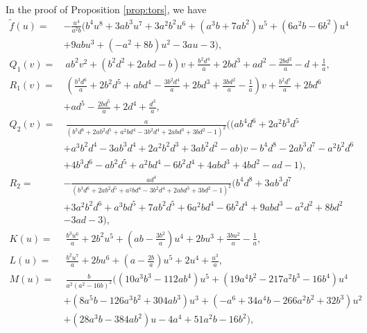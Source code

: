 \documentclass{gtpart}
\theoremstyle{definition}
\theoremstyle{remark}
\newcommand{\Tf}{\widetilde{f}}
\begin{document}
In the proof of Proposition \ref{prop:tors}, we have 
\begin{equation*}
\begin{split}
 \Tf(u) = & -\frac{u^4}{a^2 b} \big( b^4 u^8 + 3 a b^3 u^7 + 3 a^2 b^2 u^6 + (a^3 b + 7 a b^2) u^5 + (6 a^2 b - 6 b^2) u^4 \\
          & + 9 a b u^3 + (-a^2 + 8 b) u^2 - 3 a u - 3 \big), \\
 Q_1(v) = & ~ a b^2 v^2 + (b^2 d^2 + 2 a b d - b) v + \frac{b^2 d^4}{a} + 2 b d^3 + a d^2 - \frac{2 b d^2}{a} - d + \frac{1}{a}, \qquad~~
\end{split}
\end{equation*}
\begin{equation*}
\begin{split}
 R_1(v) = & ~ (\frac{b^3 d^6}{a} + 2 b^2 d^5 + a b d^4 - \frac{3 b^2 d^4}{a} + 2 b d^3 + \frac{3 b d^2}{a} - \frac{1}{a}) v + \frac{b^2 d^7}{a} + 2 b d^6 \\
          & + a d^5 - \frac{2 b d^5}{a} + 2 d^4 + \frac{d^3}{a}, \\
 Q_2(v) = & ~ \frac{a}{(b^3 d^6 + 2 a b^2 d^5 + a^2 b d^4 - 3 b^2 d^4 + 2 a b d^3 + 3 b d^2 - 1)^2} \big( (a b^4 d^6 + 2 a^2 b^3 d^5 \\
          & + a^3 b^2 d^4 - 3 a b^3 d^4 + 2 a^2 b^2 d^3 + 3 a b^2 d^2 - a b) v - b^4 d^8 - 2 a b^3 d^7 - a^2 b^2 d^6 \\
          & + 4 b^3 d^6 - a b^2 d^5 + a^2 b d^4 - 6 b^2 d^4 + 4 a b d^3 + 4 b d^2 - a d - 1 \big), \\
    R_2 = & - \frac{a d^4}{(b^3 d^6 + 2 a b^2 d^5 + a^2 b d^4 - 3 b^2 d^4 + 2 a b d^3 + 3 b d^2 - 1)^2} (b^4 d^8 + 3 a b^3 d^7 \\
          & + 3 a^2 b^2 d^6 + a^3 b d^5 + 7 a b^2 d^5 + 6 a^2 b d^4 - 6 b^2 d^4 + 9 a b d^3 - a^2 d^2 + 8 b d^2 \\
          & - 3 a d - 3), \\
   K(u) = & ~ \frac{b^3 u^6}{a} + 2 b^2 u^5 + (a b - \frac{3 b^2}{a}) u^4 + 2 b u^3 + \frac{3 b u^2}{a} - \frac{1}{a}, \\
   L(u) = & ~ \frac{b^2 u^7}{a} + 2 b u^6 + (a - \frac{2 b}{a}) u^5 + 2 u^4 + \frac{u^3}{a}, \\
   M(u) = & ~ \frac{b}{a^2 (a^2 - 16 b)^2} \big( (10 a^3 b^3 - 112 a b^4) u^5 + (19 a^4 b^2 - 217 a^2 b^3 - 16 b^4) u^4 \\
          & + (8 a^5 b - 126 a^3 b^2 + 304 a b^3) u^3 + (-a^6 + 34 a^4 b -266 a^2 b^2 +32 b^3) u^2 \\
          & + (28 a^3 b - 384 a b^2) u - 4 a^4 + 51 a^2 b - 16 b^2 \big), \\

\end{split}
\end{equation*}
\end{document}
